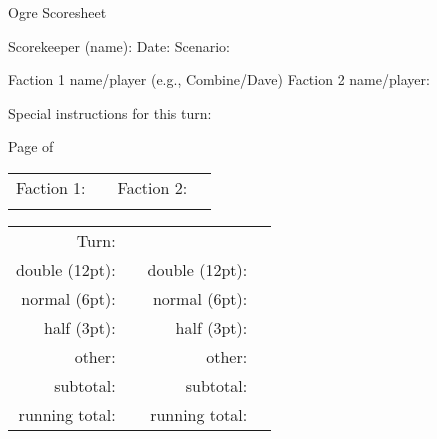 \documentclass[10pt]{article}
\begin{document}
Ogre Scoresheet

Scorekeeper (name): \underline{\hspace{1.5in}}
%
Date: \underline{\hspace{0.5in}}
%
Scenario: \underline{\hspace{1.5in}}

Faction 1 name/player (e.g., Combine/Dave)\underline{\hspace{1.0in}}
%
Faction 2 name/player:\underline{\hspace{1.0in}}

Special instructions for this turn:\underline{\hspace{4.0in}}

Page \underline{\hspace{0.3in}} of \underline{\hspace{0.3in}}

\vspace{0.2in}

\def\scoreline{\underline{\hspace{1in}}}
\def\turnspace{0.2in}

\begin{tabular}{rcrc}
  Faction 1:     & \scoreline & Faction 2:     & \scoreline \\
  \phantom{running total:} & \phantom{\scoreline} & \phantom{running total:} & \phantom{\scoreline} \\
\end{tabular}

\begin{tabular}{rcrc}
  Turn:          & \scoreline &                &            \\
  double (12pt): & \scoreline & double (12pt): & \scoreline \\
  normal (6pt):  & \scoreline & normal (6pt):  & \scoreline \\
  half (3pt):    & \scoreline & half (3pt):    & \scoreline \\
  other:         & \scoreline & other:         & \scoreline \\
  subtotal:      & \scoreline & subtotal:      & \scoreline \\
  running total: & \scoreline & running total: & \scoreline \\
\end{tabular}

\vspace{\turnspace}
\end{document}
